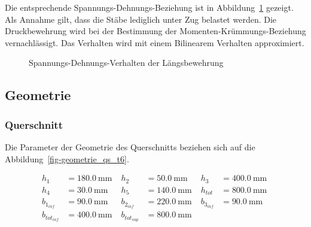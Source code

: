 \documentclass[
  11pt,
  letterpaper,
]{scrreprt}
\begin{document}
Die entsprechende Spannungs-Dehnungs-Beziehung ist in
Abbildung~\ref{fig-sigma_eps_t6} gezeigt. Als Annahme gilt, dass die
Stäbe lediglich unter Zug belastet werden. Die Druckbewehrung wird bei
der Bestimmung der Momenten-Krümmungs-Beziehung vernachlässigt. Das
Verhalten wird mit einem Bilinearem Verhalten approximiert.

\begin{figure}[H]


\caption{\label{fig-sigma_eps_t6}Spannungs-Dehnungs-Verhalten der
Längsbewehrung}

\end{figure}%

\subsection{Geometrie}\label{geometrie}

\subsubsection{Querschnitt}\label{querschnitt}

Die Parameter der Geometrie des Querschnitts beziehen sich auf die
Abbildung~\ref{fig-geometrie_qs_t6}.

$$
\begin{aligned}
h_{1} &= 180.0\ \mathrm{mm} \; 
 &h_{2} &= 50.0\ \mathrm{mm} \; 
 &h_{3} &= 400.0\ \mathrm{mm} \; 
\\[12pt]
 h_{4} &= 30.0\ \mathrm{mm} \; 
 &h_{5} &= 140.0\ \mathrm{mm} \; 
 &h_{tot} &= 800.0\ \mathrm{mm} \; 
\\[12pt]
 b_{1_{inf}} &= 90.0\ \mathrm{mm} \; 
 &b_{2_{inf}} &= 220.0\ \mathrm{mm} \; 
 &b_{3_{inf}} &= 90.0\ \mathrm{mm} \; 
\\[12pt]
 b_{tot_{inf}} &= 400.0\ \mathrm{mm} \; 
 &b_{tot_{sup}} &= 800.0\ \mathrm{mm} \;
\end{aligned}
$$
\end{document}
